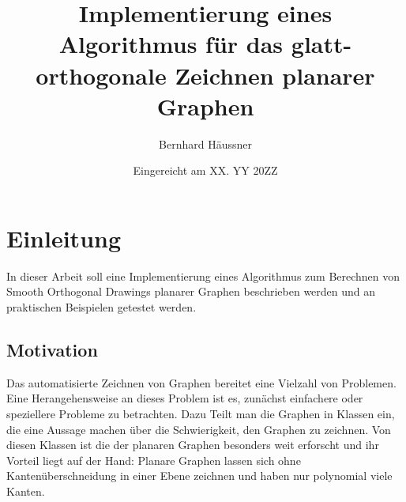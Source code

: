 \documentclass[a4paper]{scrreprt}
\theoremstyle{definition}
\begin{document}


\subject{Bachelorarbeit}
\title{Implementierung eines Algorithmus für das glatt-orthogonale Zeichnen planarer Graphen} %
\author{Bernhard Häussner} %
\date{Eingereicht am XX. YY 20ZZ} %
\titlehead{Julius-Maximilians-Universität Würzburg\\
Institut für Informatik\\
Lehrstuhl für Informatik I\\
Effiziente Algorithmen und wissensbasierte Systeme}
\publishers{Betreuer:\\
Prof.\ Dr.\ Alexander Wolff\\
Dipl.-Inf.\ Philipp Kindermann} %
\maketitle
\tableofcontents





\chapter{Einleitung}

In dieser Arbeit soll eine Implementierung eines Algorithmus 
zum Berechnen von Smooth Orthogonal Drawings planarer Graphen beschrieben werden und
an praktischen Beispielen getestet werden.

\section{Motivation}

Das automatisierte Zeichnen von Graphen bereitet eine Vielzahl von Problemen. 
Eine Herangehensweise an dieses Problem ist es, zunächst einfachere oder speziellere Probleme zu betrachten. 
Dazu Teilt man die Graphen in Klassen ein, die eine Aussage machen über die Schwierigkeit, den Graphen zu zeichnen. 
Von diesen Klassen ist die der planaren Graphen besonders weit erforscht und ihr Vorteil liegt auf der Hand:
Planare Graphen lassen sich ohne Kantenüberschneidung in einer Ebene zeichnen und haben nur polynomial viele Kanten. 
\end{document}
